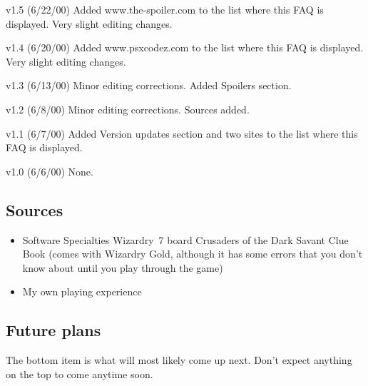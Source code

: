 \documentclass[12pt]{article}
\providecommand{\tightlist}{%
  \setlength{\itemsep}{0pt}\setlength{\parskip}{0pt}}
\begin{document}
v1.5 (6/22/00) Added www.the-spoiler.com to the list where this FAQ is
displayed. Very slight editing changes.

v1.4 (6/20/00) Added www.psxcodez.com to the list where this FAQ is
displayed. Very slight editing changes.

v1.3 (6/13/00) Minor editing corrections. Added Spoilers section.

v1.2 (6/8/00) Minor editing corrections. Sources added.

v1.1 (6/7/00) Added Version updates section and two sites to the list
where this FAQ is displayed.

v1.0 (6/6/00) None.

\subsection{Sources}\label{sources}

\begin{itemize}
\tightlist
\item Software Specialties Wizardry~7 board Crusaders of the Dark Savant Clue
Book (comes with Wizardry Gold, although it has some errors that you
don't know about until you play through the game)
\item My own playing experience
\end{itemize}

\subsection{Future plans}\label{future-plans}

The bottom item is what will most likely come up next.  Don't expect anything
on the top to come anytime soon.
\end{document}
